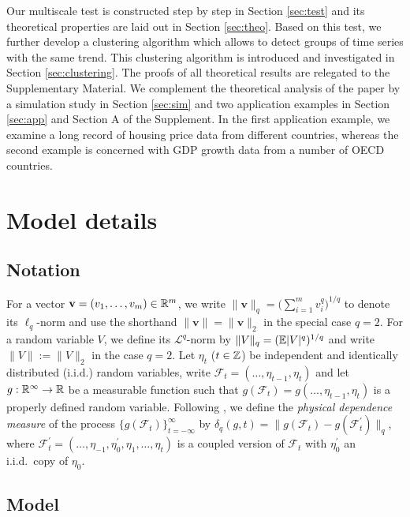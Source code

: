 \documentclass[12pt]{article}
\begin{document}
Our multiscale test is constructed step by step in Section \ref{sec:test} and its theoretical properties are laid out in Section \ref{sec:theo}. Based on this test, we further develop a clustering algorithm which allows to detect groups of time series with the same trend. This clustering algorithm is introduced and investigated in Section \ref{sec:clustering}. The proofs of all theoretical results are relegated to the Supplementary Material. We complement the theoretical analysis of the paper by a simulation study in Section \ref{sec:sim} and two application examples in Section \ref{sec:app} and Section A of the Supplement. In the first application example, we examine a long record of housing price data from different countries, whereas the second example is concerned with GDP growth data from a number of OECD countries. 



\section{Model details}\label{sec:model}


\subsection{Notation}\label{subsec:model_notation}


For a vector $\mathbf{v} = (v_1, \ldots, v_m)\in\mathbb{R}^m$, we write $\|\mathbf{v}\|_q = \big(\sum_{i=1}^m v_i^q\big)^{1/q}$ to denote its $\ell_q$-norm and use the shorthand $\|\mathbf{v}\| = \|\mathbf{v}\|_2$ in the special case $q = 2$. For a random variable $V$, we define its $\mathcal{L}^q$-norm by $\|V\|_q = (\mathbb{E} |V|^q)^{1/q}$ and write $\|V\| := \|V\|_2$ in the case $q = 2$.
Let $\eta_t$ ($t \in \mathbb{Z}$) be independent and identically distributed ($\text{i.i.d.}$) random variables, write $\mathcal{F}_t  = (\ldots, \eta_{t-1}, \eta_t)$ and let $g: \mathbb{R}^\infty \to \mathbb{R}$ be a measurable function such that $g(\mathcal{F}_t) = g(\ldots, \eta_{t-1}, \eta_t)$ is a properly defined random variable. Following \cite{Wu2005}, we define the \textit{physical dependence measure} of the process $\{g(\mathcal{F}_t)\}_{t=-\infty}^\infty$ by $\delta_q(g, t) = \| g(\mathcal{F}_t) - g(\mathcal{F}_t^\prime) \|_q$, where $\mathcal{F}_t^\prime  = (\ldots, \eta_{-1}, \eta^\prime_0, \eta_1, \ldots, \eta_t)$ is a coupled version of $\mathcal{F}_t$ with $\eta_0^\prime$ an i.i.d.\ copy of $\eta_0$. 


\subsection{Model}\label{subsec:model_setting}
\end{document}
